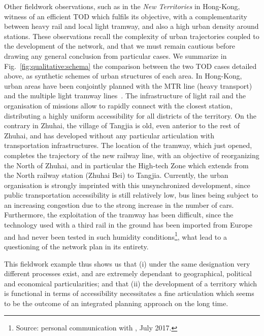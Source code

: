 Other fieldwork observations, such as in the \emph{New Territories} in Hong-Kong, witness of an efficient TOD which fulfils its objective, with a complementarity between heavy rail and local light tramway, and also a high urban density around stations. These observations recall the complexity of urban trajectories coupled to the development of the network, and that we must remain cautious before drawing any general conclusion from particular cases. We summarize in Fig.~\ref{fig:qualitative:schema} the comparison between the two TOD cases detailed above, as synthetic schemes of urban structures of each area. In Hong-Kong, urban areas have been conjointly planned with the MTR line (heavy transport) and the multiple light tramway lines~\cite{hui2005study}. The infrastructure of light rail and the organisation of missions allow to rapidly connect with the closest station, distributing a highly uniform accessibility for all districts of the territory. On the contrary in Zhuhai, the village of Tangjia is old, even anterior to the rest of Zhuhai, and has developed without any particular articulation with transportation infrastructures. The location of the tramway, which just opened, completes the trajectory of the new railway line, with an objective of reorganizing the North of Zhuhai, and in particular the High-tech Zone which extends from the North railway station (Zhuhai Bei) to Tangjia. Currently, the urban organisation is strongly imprinted with this unsynchronized development, since public transportation accessibility is still relatively low, bus lines being subject to an increasing congestion due to the strong increase in the number of cars. Furthermore, the exploitation of the tramway has been difficult, since the technology used with a third rail in the ground has been imported from Europe and had never been tested in such humidity conditions\footnote{Source: personal communication with , July 2017.}, what lead to a questioning of the network plan in its entirety. 

This fieldwork example thus shows us that (i) under the same designation very different processes exist, and are extremely dependant to geographical, political and economical particularities; and that (ii) the development of a territory which is functional in terms of accessibility necessitates a fine articulation which seems to be the outcome of an integrated planning approach on the long time.

